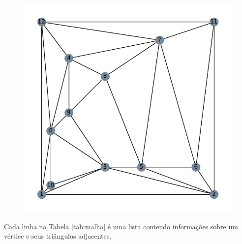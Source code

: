 \documentclass{article}
\begin{document}
\begin{figure}[H]
  \label{fig:grafo_dual}
  \centering
  \includegraphics[scale=0.7]{grafo_dual.pdf}
\end{figure}

Cada linha na Tabela \ref{tab:malha} é uma lista contendo informações sobre um vértice e seus triângulos adjacentes.
\end{document}
